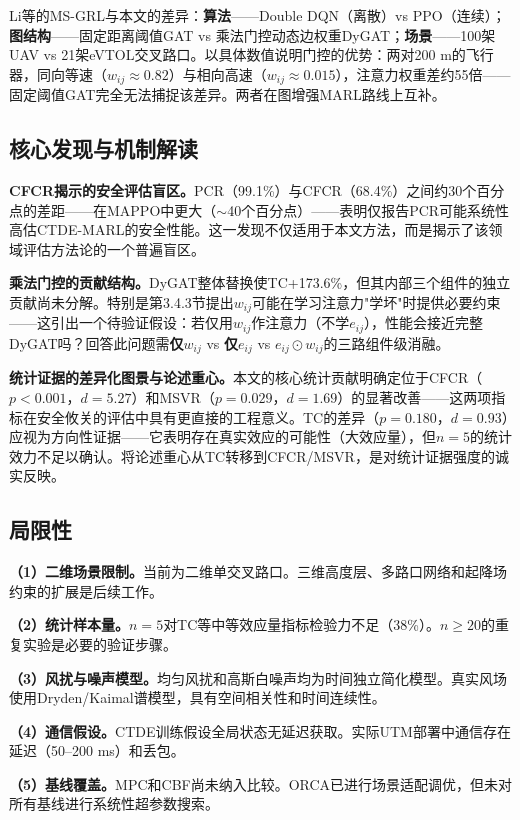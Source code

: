 \documentclass[12pt,a4paper,UTF8]{ctexart}
\begin{document}
Li等\cite{ref10}的MS-GRL与本文的差异：\textbf{算法}——Double DQN（离散）vs PPO（连续）；\textbf{图结构}——固定距离阈值GAT vs 乘法门控动态边权重DyGAT；\textbf{场景}——100架UAV vs 21架eVTOL交叉路口。以具体数值说明门控的优势：两对200 m的飞行器，同向等速（$w_{ij}\approx0.82$）与相向高速（$w_{ij}\approx0.015$），注意力权重差约55倍——固定阈值GAT完全无法捕捉该差异。两者在图增强MARL路线上互补。

\subsection{核心发现与机制解读}

\textbf{CFCR揭示的安全评估盲区。}PCR（99.1\%）与CFCR（68.4\%）之间约30个百分点的差距——在MAPPO中更大（$\sim$40个百分点）——表明仅报告PCR可能系统性高估CTDE-MARL的安全性能。这一发现不仅适用于本文方法，而是揭示了该领域评估方法论的一个普遍盲区。

\textbf{乘法门控的贡献结构。}DyGAT整体替换使TC+173.6\%，但其内部三个组件的独立贡献尚未分解。特别是第3.4.3节提出$w_{ij}$可能在学习注意力"学坏"时提供必要约束——这引出一个待验证假设：若仅用$w_{ij}$作注意力（不学$e_{ij}$），性能会接近完整DyGAT吗？回答此问题需\textbf{仅$w_{ij}$} vs \textbf{仅$e_{ij}$} vs \textbf{$e_{ij}\odot w_{ij}$}的三路组件级消融。

\textbf{统计证据的差异化图景与论述重心。}本文的核心统计贡献明确定位于CFCR（$p<0.001$，$d=5.27$）和MSVR（$p=0.029$，$d=1.69$）的显著改善——这两项指标在安全攸关的评估中具有更直接的工程意义。TC的差异（$p=0.180$，$d=0.93$）应视为方向性证据——它表明存在真实效应的可能性（大效应量），但$n=5$的统计效力不足以确认。将论述重心从TC转移到CFCR/MSVR，是对统计证据强度的诚实反映。

\subsection{局限性}

\textbf{（1）二维场景限制。}当前为二维单交叉路口。三维高度层、多路口网络和起降场约束的扩展是后续工作。

\textbf{（2）统计样本量。}$n=5$对TC等中等效应量指标检验力不足（38\%）。$n\geq20$的重复实验是必要的验证步骤。

\textbf{（3）风扰与噪声模型。}均匀风扰和高斯白噪声均为时间独立简化模型。真实风场使用Dryden/Kaimal谱模型，具有空间相关性和时间连续性。

\textbf{（4）通信假设。}CTDE训练假设全局状态无延迟获取。实际UTM部署中通信存在延迟（50--200 ms）和丢包。

\textbf{（5）基线覆盖。}MPC和CBF尚未纳入比较。ORCA已进行场景适配调优，但未对所有基线进行系统性超参数搜索。
\end{document}
